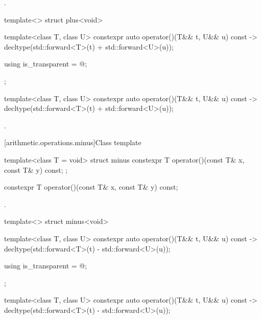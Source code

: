 \begin{itemdescr}
\pnum
\returns
{}.
\end{itemdescr}

%
\begin{itemdecl}
template<> struct plus<void> {
  template<class T, class U> constexpr auto operator()(T&& t, U&& u) const
    -> decltype(std::forward<T>(t) + std::forward<U>(u));

  using is_transparent = @\unspec@;
};
\end{itemdecl}

%
\begin{itemdecl}
template<class T, class U> constexpr auto operator()(T&& t, U&& u) const
    -> decltype(std::forward<T>(t) + std::forward<U>(u));
\end{itemdecl}

\begin{itemdescr}
\pnum
\returns
{}.
\end{itemdescr}

[arithmetic.operations.minus]{Class template }

%
\begin{itemdecl}
template<class T = void> struct minus {
  constexpr T operator()(const T& x, const T& y) const;
};
\end{itemdecl}

%
\begin{itemdecl}
constexpr T operator()(const T& x, const T& y) const;
\end{itemdecl}

\begin{itemdescr}
\pnum
\returns
{}.
\end{itemdescr}

%
\begin{itemdecl}
template<> struct minus<void> {
  template<class T, class U> constexpr auto operator()(T&& t, U&& u) const
    -> decltype(std::forward<T>(t) - std::forward<U>(u));

  using is_transparent = @\unspec@;
};
\end{itemdecl}

%
\begin{itemdecl}
template<class T, class U> constexpr auto operator()(T&& t, U&& u) const
    -> decltype(std::forward<T>(t) - std::forward<U>(u));
\end{itemdecl}

